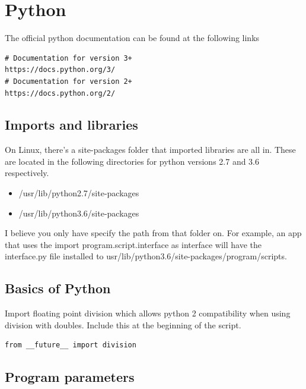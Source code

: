 \chapter{Python}
\thispagestyle{fancy}
\lstset{language=Python}

The official python documentation can be found at the following links
\begin{lstlisting}
# Documentation for version 3+
https://docs.python.org/3/
# Documentation for version 2+
https://docs.python.org/2/
\end{lstlisting}


\section{Imports and libraries}

On Linux, there's a site-packages folder that imported libraries are all in. These are located in the following directories for python versions 2.7 and 3.6 respectively.

\begin{itemize}
	\item /usr/lib/python2.7/site-packages
	\item /usr/lib/python3.6/site-packages
\end{itemize}

I believe you only have specify the path from that folder on. For example, an app that uses the import program.script.interface as interface will have the interface.py file installed to usr/lib/python3.6/site-packages/program/scripts.

\section{Basics of Python}

Import floating point division which allows python 2 compatibility when using division with doubles. Include this at the beginning of the script.
\begin{lstlisting}
from __future__ import division
\end{lstlisting}



\section{Program parameters}

